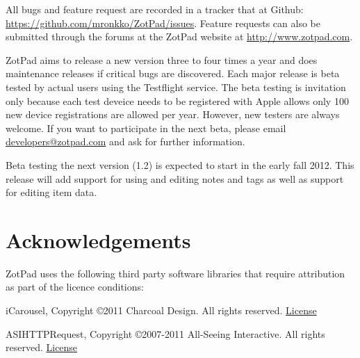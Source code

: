 \documentclass[oneside, openany, 12pt]{tufte-book}
\newcommand{\ipad}[1]{}
\newcommand{\ipad}[1]{#1}
\begin{document}
All bugs and feature request are recorded in a tracker that at Github: \url{https://github.com/mronkko/ZotPad/issues}. Feature requests can also be submitted through the forums at the ZotPad website at \url{http://www.zotpad.com}. 

ZotPad aims to release a new version three to four times a year and does maintenance releases if critical bugs are discovered. Each major release is beta tested by actual users using the Testflight service. The beta testing is invitation only because each test deveice needs to be registered with Apple allows only 100 new device registrations are allowed per year. However, new testers are always welcome. If you want to participate in the next beta, please email \href{mailto:developers@zotpad.com}{developers@zotpad.com} and ask for further information.

Beta testing the next version (1.2) is expected to start in the early fall 2012. This release will add support for using and editing notes and tags as well as support for editing item data.

\chapter{Acknowledgements}

\ipad{\begin{fullwidth}}

\setlength{\parindent}{0pt}

\setlength{\parskip}{\baselineskip}

ZotPad uses the following third party software libraries that require attribution as part of the licence conditions:

iCarousel, Copyright \copyright 2011 Charcoal Design. All rights reserved. \href{https://raw.github.com/nicklockwood/iCarousel/104d499da7b107b8baa58ab85c6d0f44d504e957/LICENCE.md}{License}

ASIHTTPRequest, Copyright \copyright 2007-2011 All-Seeing Interactive. All rights reserved. \href{https://raw.github.com/pokeb/asi-http-request/3cb0230e547b0d13d88843ec7fc6ed77d69cb7c6/LICENSE}{License}
\end{document}
